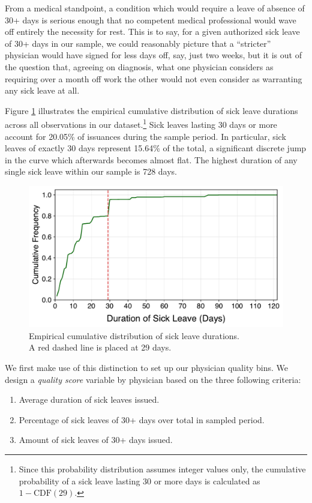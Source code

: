 \documentclass[../main.tex]{subfiles}
\begin{document}
From a medical standpoint, a condition which would require a leave of absence of 30+ days is serious enough that no competent medical professional would wave off entirely the necessity for rest. This is to say, for a given authorized sick leave of 30+ days in our sample, we could reasonably picture that a ``stricter'' physician would have signed for less days off, say, just two weeks, but it is out of the question that, agreeing on diagnosis, what one physician considers as requiring over a month off work the other would not even consider as warranting any sick leave at all.

Figure \ref{fig:cdf} illustrates the empirical cumulative distribution of sick leave durations across all observations in our dataset.\footnote{Since this probability distribution assumes integer values only, the cumulative probability of a sick leave lasting 30 or more days is calculated as $1 - \text{CDF}(29)$.} Sick leaves lasting 30 days or more account for 20.05\% of issuances during the sample period. In particular, sick leaves of exactly 30 days represent 15.64\% of the total, a significant discrete jump in the curve which afterwards becomes almost flat. The highest duration of any single sick leave within our sample is 728 days.

\begin{figure}[H]
    \centering
    \includegraphics[width=0.70\linewidth]{cdf.pdf}
    \captionsetup{justification=centerlast}
    \caption{Empirical cumulative distribution of sick leave durations. \\ A red dashed line is placed at 29 days.}
    \label{fig:cdf}
\end{figure}



We first make use of this distinction to set up our physician quality bins. We design a \textit{quality score} variable by physician based on the three following criteria:
\begin{enumerate}[label=\roman*, itemsep=0pt, topsep=0pt]
    \item Average duration of sick leaves issued.
    \item Percentage of sick leaves of 30+ days over total in sampled period.
    \item Amount of sick leaves of 30+ days issued.
\end{enumerate}
\end{document}
